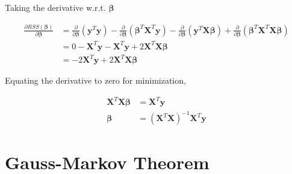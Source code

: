 \documentclass[11pt, a4paper]{article}
\begin{document}
Taking the derivative w.r.t. $\boldsymbol{\beta}$

\begin{align*}
    \frac{\partial RSS(\boldsymbol{\beta})}{\partial \boldsymbol{\beta}} &= 
    \frac{\partial}{\partial \boldsymbol{\beta}}(\mathbf{y}^T\mathbf{y}) - \frac{\partial}{\partial \boldsymbol{\beta}}(\boldsymbol{\beta}^T\mathbf{X}^T\mathbf{y}) - \frac{\partial}{\partial \boldsymbol{\beta}}(\mathbf{y}^T\mathbf{X}\boldsymbol{\beta}) + \frac{\partial}{\partial \boldsymbol{\beta}}(\boldsymbol{\beta}^T\mathbf{X}^T\mathbf{X}\boldsymbol{\beta}) \\
    &= 0 - \mathbf{X}^T\mathbf{y} - \mathbf{X}^T\mathbf{y} + 2\mathbf{X}^T\mathbf{X}\boldsymbol{\beta} \\
    &= -2\mathbf{X}^T\mathbf{y} + 2\mathbf{X}^T\mathbf{X}\boldsymbol{\beta}
\end{align*}

Equating the derivative to zero for minimization,

\begin{align*}
    \mathbf{X}^T\mathbf{X}\boldsymbol{\beta} &= \mathbf{X}^T\mathbf{y} \\
    \boldsymbol{\beta} &= (\mathbf{X}^T\mathbf{X})^{-1}\mathbf{X}^T\mathbf{y}    
\end{align*}

\section{Gauss-Markov Theorem}
\end{document}
